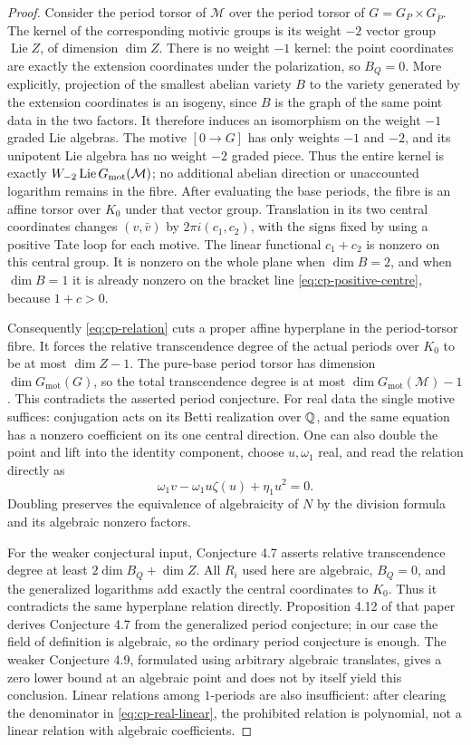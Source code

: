 \begin{proof}
Consider the period torsor of $\mathcal M$ over the period
torsor of $G=G_P\times G_{\bar P}$. The kernel of the
corresponding motivic groups is its weight $-2$ vector group
$\operatorname{Lie}Z$, of dimension $\dim Z$. There is no
weight $-1$ kernel: the point coordinates are exactly the
extension coordinates under the polarization, so $B_Q=0$.
More explicitly, projection of the smallest abelian variety $B$
to the variety generated by the extension coordinates is an
isogeny, since $B$ is the graph of the same point data in the
two factors. It therefore induces an isomorphism on the
weight $-1$ graded Lie algebras. The motive $[0\to G]$ has
only weights $-1$ and $-2$, and its unipotent Lie algebra has
no weight $-2$ graded piece. Thus the entire kernel is exactly
$W_{-2}\operatorname{Lie}G_{\rm mot}(\mathcal M)$; no additional
abelian direction or unaccounted logarithm remains in the fibre.
After evaluating the base periods, the fibre is an affine
torsor over $K_0$ under that vector group. Translation in
its two central coordinates changes $(v,\bar v)$ by
$2\pi i(c_1,c_2)$, with the signs fixed by using a positive
Tate loop for each motive. The linear functional
$c_1+c_2$ is nonzero on this central group. It is nonzero
on the whole plane when $\dim B=2$, and when $\dim B=1$
it is already nonzero on the bracket line
\eqref{eq:cp-positive-centre}, because $1+c>0$.

Consequently \eqref{eq:cp-relation} cuts a proper affine
hyperplane in the period-torsor fibre. It forces the relative
transcendence degree of the actual periods over $K_0$ to be
at most $\dim Z-1$. The pure-base period torsor has dimension
$\dim G_{\mathrm{mot}}(G)$, so the total transcendence degree
is at most $\dim G_{\mathrm{mot}}(\mathcal M)-1$.
This contradicts the asserted period conjecture. For real
data the single motive suffices: conjugation acts on its
Betti realization over $\mathbb Q$, and the same equation has a
nonzero coefficient on its one central direction. One can
also double the point and lift into the identity component,
choose $u,\omega_1$ real, and read the relation directly as
\[
 \omega_1 v-\omega_1u\zeta(u)+\eta_1u^2=0.
\]
Doubling preserves the equivalence of algebraicity of $N$
by the division formula and its algebraic nonzero factors.

For the weaker conjectural input, Conjecture 4.7 asserts
relative transcendence degree at least $2\dim B_Q+\dim Z$.
All $R_i$ used here are algebraic, $B_Q=0$, and the
generalized logarithms add exactly the central coordinates
to $K_0$. Thus it contradicts the same hyperplane relation
directly. Proposition 4.12 of that paper derives Conjecture
4.7 from the generalized period conjecture; in our case the
field of definition is algebraic, so the ordinary period
conjecture is enough. The weaker Conjecture 4.9, formulated
using arbitrary algebraic translates, gives a zero lower
bound at an algebraic point and does not by itself yield
this conclusion. Linear relations among $1$-periods are
also insufficient: after clearing the denominator in
\eqref{eq:cp-real-linear}, the prohibited relation is
polynomial, not a linear relation with algebraic coefficients.
\end{proof}


